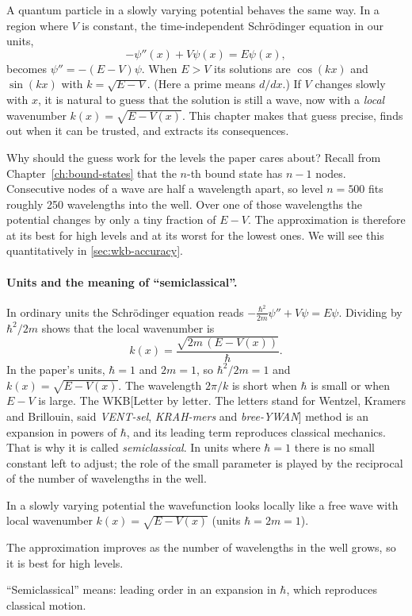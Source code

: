 A quantum particle in a slowly varying potential behaves the same way. In a region where $V$ is constant, the time-independent Schr\"odinger equation in our units,
\begin{equation}
-\psi''(x)+V\psi(x)=E\psi(x),
\label{eq:wkb-tise}
\end{equation}
becomes $\psi''=-(E-V)\psi$. When $E>V$ its solutions are $\cos(kx)$ and $\sin(kx)$ with $k=\sqrt{E-V}$. (Here a prime means $d/dx$.) If $V$ changes slowly with $x$, it is natural to guess that the solution is still a wave, now with a \emph{local} wavenumber $k(x)=\sqrt{E-V(x)}$. This chapter makes that guess precise, finds out when it can be trusted, and extracts its consequences.

Why should the guess work for the levels the paper cares about? Recall from Chapter~\ref{ch:bound-states} that the $n$-th bound state has $n-1$ nodes. Consecutive nodes of a wave are half a wavelength apart, so level $n=500$ fits roughly 250 wavelengths into the well. Over one of those wavelengths the potential changes by only a tiny fraction of $E-V$. The approximation is therefore at its best for high levels and at its worst for the lowest ones. We will see this quantitatively in \cref{sec:wkb-accuracy}.

\paragraph{Units and the meaning of ``semiclassical''.} In ordinary units the Schr\"odinger equation reads $-\frac{\hbar^2}{2m}\psi''+V\psi=E\psi$. Dividing by $\hbar^2/2m$ shows that the local wavenumber is
\begin{equation}
k(x)=\frac{\sqrt{2m\,(E-V(x))}}{\hbar}.
\label{eq:wkb-kgeneral}
\end{equation}
In the paper's units, $\hbar=1$ and $2m=1$, so $\hbar^2/2m=1$ and $k(x)=\sqrt{E-V(x)}$. The wavelength $2\pi/k$ is short when $\hbar$ is small or when $E-V$ is large. The WKB[Letter by letter. The letters stand for Wentzel, Kramers and Brillouin, said \emph{VENT-sel}, \emph{KRAH-mers} and \emph{bree-YWAN}] method is an expansion in powers of $\hbar$, and its leading term reproduces classical mechanics. That is why it is called \emph{semiclassical}. In units where $\hbar=1$ there is no small constant left to adjust; the role of the small parameter is played by the reciprocal of the number of wavelengths in the well.

\begin{keyideas}
\item In a slowly varying potential the wavefunction looks locally like a free wave with local wavenumber $k(x)=\sqrt{E-V(x)}$ (units $\hbar=2m=1$).
\item The approximation improves as the number of wavelengths in the well grows, so it is best for high levels.
\item ``Semiclassical'' means: leading order in an expansion in $\hbar$, which reproduces classical motion.
\end{keyideas}


